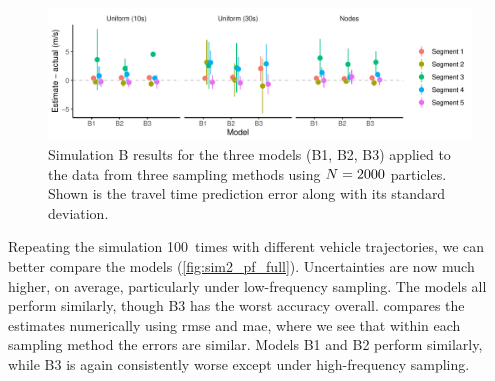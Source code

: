 \begin{knitrout}\small
{}\color{fgcolor}\begin{figure}
\includegraphics[width=\linewidth]{figure/sim2_pf-1} \caption[Results for simulation B]{Simulation B results for the three models (B1, B2, B3) applied to the data from three sampling methods using $N=2000$ particles. Shown is the travel time prediction error along with its standard deviation.}\label{fig:sim2_pf}
\end{figure}


\end{knitrout}


Repeating the simulation 100~times with different vehicle trajectories, we can better compare the models (\cref{fig:sim2_pf_full}). Uncertainties are now much higher, on average, particularly under low-frequency sampling. The models all perform similarly, though B3 has the worst accuracy overall.  compares the estimates numerically using \gls{rmse} and \gls{mae}, where we see that within each sampling method the errors are similar. Models B1 and B2 perform similarly, while B3 is again consistently worse except under high-frequency sampling.


